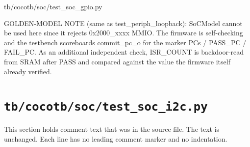 \begin{relocated}{tb/cocotb/soc/test_soc_gpio.py}
\begin{textblock}
GOLDEN-MODEL NOTE (same as test_periph_loopback): SoCModel cannot be used
here since it rejects 0x2000_xxxx MMIO. The firmware is self-checking and
the testbench scoreboards commit_pc_o for the marker PCs / PASS_PC / FAIL_PC.
As an additional independent check, ISR_COUNT is backdoor-read from SRAM
after PASS and compared against the value the firmware itself already
verified.
\end{textblock}

\end{relocated}

\section{\texttt{tb/cocotb/soc/test\_soc\_i2c.py}}\label{tm:suite:soc-test-soc-i2c}

This section holds comment text that was in the source file. The text is unchanged. Each line has no leading comment marker and no indentation.

